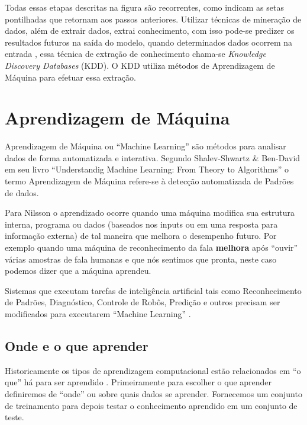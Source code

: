 Todas essas etapas descritas na figura são recorrentes, como indicam as setas pontilhadas que retornam aos passos anteriores.
Utilizar técnicas de mineração de dados, além de extrair dados, extrai conhecimento, com isso pode-se predizer os resultados futuros na saída do modelo, 
quando determinados dados ocorrem na entrada \cite{Amin2015a}, essa técnica de extração de conhecimento chama-se \textit{Knowledge Discovery Databases} (KDD).
O KDD utiliza métodos de Aprendizagem de Máquina para efetuar essa extração.



\pagebreak


\section{Aprendizagem de Máquina}\label{arte:palavraChave:Machine}


Aprendizagem de Máquina ou ``Machine Learning'' são métodos para analisar dados de forma automatizada e interativa.
Segundo Shalev-Shwartz \& Ben-David \cite{Ben-David2014} em seu livro ``Understandig Machine Learning: From Theory to Algorithms'' 
o termo Aprendizagem de Máquina refere-se à detecção automatizada de Padrões de dados.

Para Nilsson \cite{Nilsson2005} o aprendizado ocorre quando uma máquina modifica sua estrutura interna, programa ou dados 
(baseados nos inputs ou em uma resposta para informação externa) de tal maneira que melhora o desempenho futuro. Por exemplo quando uma 
máquina de reconhecimento da fala \textbf{melhora} após ``ouvir'' várias amostras de fala humanas e que nós sentimos que pronta, neste caso
podemos dizer que a máquina aprendeu. 

Sistemas que executam tarefas de inteligência artificial tais como Reconhecimento de Padrões, Diagnóstico, Controle de Robôs, Predição e 
outros precisam ser modificados para executarem ``Machine Learning'' \cite{Nilsson2005}.

\subsection{Onde e o que aprender}

Historicamente os tipos de aprendizagem computacional estão relacionados em ``o que'' há para ser aprendido \cite{Nilsson2005}. 
Primeiramente para escolher o que aprender definiremos de ``onde'' ou sobre quais dados se aprender.
Fornecemos um conjunto de treinamento para depois testar o conhecimento aprendido em um conjunto de teste.


